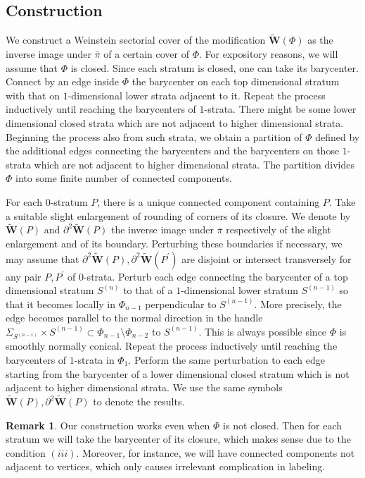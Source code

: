 \documentclass[a4paper,12pt, twoside, pdftex]{amsart}
\theoremstyle{definition}
\newtheorem{remark}[dummy]{Remark}
\numberwithin{equation}{section}
\newcommand{\del}{\partial}
\newcommand{\bfW}{\mathbf{W}}
\begin{document}
\subsection{Construction}
We construct a Weinstein sectorial cover of the modification
$\widetilde{\bfW}(\Phi)$
as the inverse image under
$\bar{\pi}$
of a certain cover of
$\Phi$.
For expository reasons,
we will assume that
$\Phi$
is closed.
Since each stratum is closed,
one can take its barycenter.
Connect by an edge inside
$\Phi$
the barycenter on each top dimensional stratum with that on $1$-dimensional lower strata adjacent to it.
Repeat the process inductively until reaching the barycenters of $1$-strata.
There might be some lower dimensional closed strata
which are not adjacent to higher dimensional strata.
Beginning the process also from such strata,
we obtain a partition of
$\Phi$
defined by
the additional edges connecting the barycenters
and
the barycenters on those $1$-strata
which are not adjacent to higher dimensional strata.
The partition divides
$\Phi$
into some finite number of connected components.
 
For each $0$-stratum
$P$,
there is a unique connected component containing
$P$.
Take a suitable slight enlargement of rounding of corners of its closure.
We denote by
$\widetilde{\bfW}(P)$
and
$\del^2 \widetilde{\bfW}(P)$
the inverse image under
$\bar{\pi}$
respectively
of the slight enlargement
and
of its boundary.
Perturbing these boundaries if necessary,
we may assume that
$\del^2 \widetilde{\bfW}(P), \del^2 \widetilde{\bfW}(P^\prime)$
are
disjoint
or
intersect transversely
for any pair
$P, P^\prime$
of $0$-strata.
Perturb each edge connecting the barycenter of a top dimensional stratum
$S^{(n)}$
to that of a $1$-dimensional lower stratum
$S^{(n-1)}$
so that
it becomes locally in
$\Phi_{n-1}$
perpendicular to
$S^{(n-1)}$.
More precisely,
the edge becomes parallel to the normal direction in the handle
$\Sigma_{S^{(n-1)}} \times S^{(n-1)}
\subset
\Phi_{n-1} \setminus \Phi_{n-2}$
to 
$S^{(n-1)}$. 
This is always possible
since
$\Phi$
is smoothly normally conical.
Repeat the process inductively until reaching the barycenters of $1$-strata in
$\Phi_1$.
Perform the same perturbation to each edge starting from the barycenter of a lower dimensional closed stratum
which is not adjacent to higher dimensional strata.
We use the same symbols
$\widetilde{\bfW}(P), \del^2 \widetilde{\bfW}(P)$
to denote the results.

\begin{remark}
Our construction works even
when
$\Phi$
is not closed.
Then for each stratum we will take the barycenter of its closure,
which makes sense due to the condition
$(iii)$.
Moreover,
for instance,
we will have connected components not adjacent to vertices,
which only causes irrelevant complication in labeling.
\end{remark}
\end{document}
